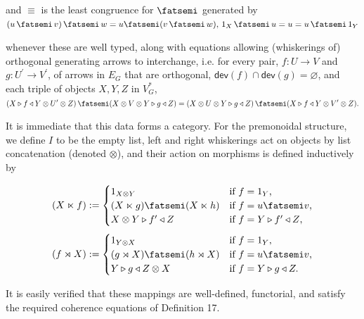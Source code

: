 and $\equiv$ is the least congruence for $\mathop{\fatsemi}$ generated by $(u\mathop{\fatsemi}v)\mathop{\fatsemi}w=u{\mathop{\fatsemi}}(v\mathop{\fatsemi}w),\,1_{X}\mathop{\fatsemi}u=u=u\mathop{\fatsemi}1_{Y}$\par
 
 
  
whenever these are well typed, along with equations allowing (whiskerings of) orthogonal generating arrows to interchange, i.e. for every pair, $f\colon U\to V$ and $g\colon U^{\prime}\to V^{\prime}$, of arrows in $E_{G}$ that are orthogonal, $\mathsf{dev}(f)\cap\mathsf{dev}(g)=\varnothing$, and each triple of objects $X,Y,Z$ in $V_{G}^{*}$,      $\displaystyle(X\triangleright f\triangleleft Y\otimes U^{\prime}\otimes Z)\mathop{\fatsemi}(X\otimes V\otimes Y\triangleright g\triangleleft Z)=(X\otimes U\otimes Y\triangleright g\triangleleft Z)\mathop{\fatsemi}(X\triangleright f\triangleleft Y\otimes V^{\prime}\otimes Z).$\par
 
 
 
It is immediate that this data forms a category. For the premonoidal structure, we define $I$ to be the empty list, left and right whiskerings act on objects by list concatenation (denoted $\otimes$), and their action on morphisms is defined inductively by\par
    \[(X\ltimes f):=\begin{cases}1_{X\otimes Y}&\text{if $f=1_{Y}$,}\\
(X\ltimes g){\mathop{\fatsemi}}(X\ltimes h)&\text{if $f=u{\mathop{\fatsemi}}v$,}\\
X\otimes Y\triangleright f^{\prime}\triangleleft Z&\text{if $f=Y\triangleright
f^{\prime}\triangleleft Z$,}\end{cases}\]       \[(f\rtimes X):=\begin{cases}1_{Y\otimes X}&\text{if $f=1_{Y}$,}\\
(g\rtimes X){\mathop{\fatsemi}}(h\rtimes X)&\text{if $f=u{\mathop{\fatsemi}}v$,}\\
Y\triangleright g\triangleleft Z\otimes X&\text{if $f=Y\triangleright g\triangleleft Z.$}\end{cases}\]    
 
 
It is easily verified that these mappings are well-defined, functorial, and satisfy the required coherence equations of Definition 17.\par
 
